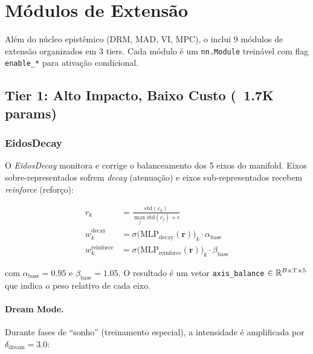 
\section{M\'odulos de Extens\~ao}
\label{sec:extensoes}

Al\'em do n\'ucleo epist\^emico (DRM, MAD, VI, MPC), o \aletheion{} inclui
9 m\'odulos de extens\~ao organizados em 3 tiers. Cada m\'odulo \'e um
\texttt{nn.Module} trein\'avel com flag \texttt{enable\_*} para
ativa\c{c}\~ao condicional.

\subsection{Tier 1: Alto Impacto, Baixo Custo (~1.7K params)}

\subsubsection{EidosDecay}
\label{sec:eidos}

O \textit{EidosDecay} monitora e corrige o balanceamento dos 5 eixos do manifold.
Eixos sobre-representados sofrem \textit{decay} (atenua\c{c}\~ao) e eixos
sub-representados recebem \textit{reinforce} (refor\c{c}o):

\begin{align}
    r_k &= \frac{\text{std}(c_k)}{\max_j \text{std}(c_j) + \epsilon} \label{eq:eidos_ratio} \\
    w_k^{\text{decay}} &= \sigma\big(\text{MLP}_{\text{decay}}(\bm{r})\big)_k \cdot \alpha_{\text{base}} \\
    w_k^{\text{reinforce}} &= \sigma\big(\text{MLP}_{\text{reinforce}}(\bm{r})\big)_k \cdot \beta_{\text{base}}
\end{align}

com $\alpha_{\text{base}} = 0.95$ e $\beta_{\text{base}} = 1.05$. O resultado
\'e um vetor \texttt{axis\_balance} $\in \mathbb{R}^{B \times T \times 5}$ que indica
o peso relativo de cada eixo.

\paragraph{Dream Mode.} Durante fases de ``sonho'' (treinamento especial),
a intensidade \'e amplificada por $\delta_{\text{dream}} = 3.0$:

